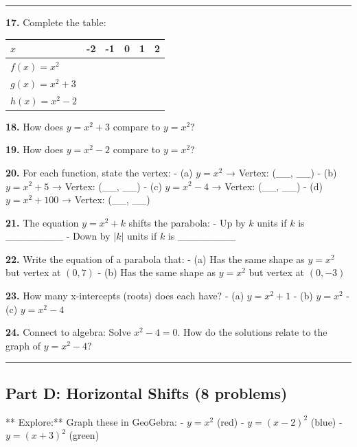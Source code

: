 \documentclass[
  11pt,
]{article}
\begin{document}
\begin{center}\rule{0.5\linewidth}{0.5pt}\end{center}

\textbf{17.} Complete the table:

\begin{longtable}[]{@{}llllll@{}}
\toprule\noalign{}
\(x\) & -2 & -1 & 0 & 1 & 2 \\
\midrule\noalign{}
\endhead
\bottomrule\noalign{}
\endlastfoot
\(f(x) = x^2\) & & & & & \\
\(g(x) = x^2 + 3\) & & & & & \\
\(h(x) = x^2 - 2\) & & & & & \\
\end{longtable}

\textbf{18.} How does \(y = x^2 + 3\) compare to \(y = x^2\)?

\textbf{19.} How does \(y = x^2 - 2\) compare to \(y = x^2\)?

\textbf{20.} For each function, state the vertex: - (a) \(y = x^2\) →
Vertex: (\_\_, \_\_) - (b) \(y = x^2 + 5\) → Vertex: (\_\_, \_\_) - (c)
\(y = x^2 - 4\) → Vertex: (\_\_, \_\_) - (d) \(y = x^2 + 100\) → Vertex:
(\_\_, \_\_)

\textbf{21.} The equation \(y = x^2 + k\) shifts the parabola: - Up by
\(k\) units if \(k\) is \_\_\_\_\_\_\_\_ - Down by \(|k|\) units if
\(k\) is \_\_\_\_\_\_\_\_

\textbf{22.} Write the equation of a parabola that: - (a) Has the same
shape as \(y = x^2\) but vertex at \((0, 7)\) - (b) Has the same shape
as \(y = x^2\) but vertex at \((0, -3)\)

\textbf{23.} How many x-intercepts (roots) does each have? - (a)
\(y = x^2 + 1\) - (b) \(y = x^2\) - (c) \(y = x^2 - 4\)

\textbf{24.} Connect to algebra: Solve \(x^2 - 4 = 0\). How do the
solutions relate to the graph of \(y = x^2 - 4\)?

\begin{center}\rule{0.5\linewidth}{0.5pt}\end{center}

\hypertarget{part-d-horizontal-shifts-8-problems}{%
\subsection{Part D: Horizontal Shifts (8
problems)}\label{part-d-horizontal-shifts-8-problems}}

** Explore:** Graph these in GeoGebra: - \(y = x^2\) (red) -
\(y = (x - 2)^2\) (blue) - \(y = (x + 3)^2\) (green)
\end{document}
